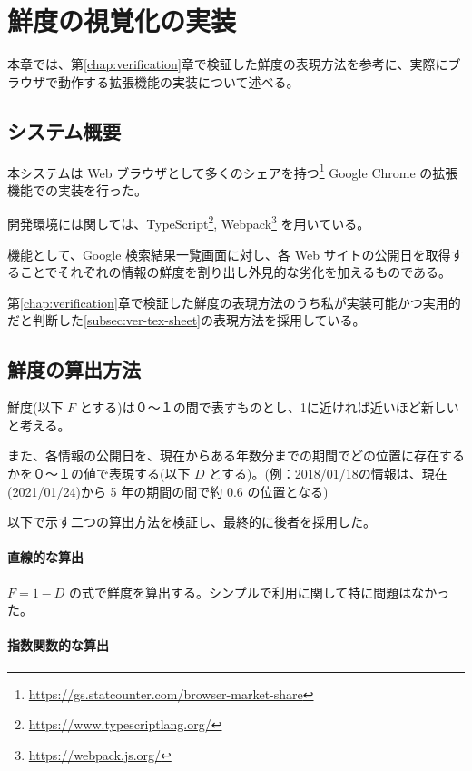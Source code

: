 \chapter{鮮度の視覚化の実装}
\label{chap:implementation}

本章では、第\ref{chap:verification}章で検証した鮮度の表現方法を参考に、実際にブラウザで動作する拡張機能の実装について述べる。

\section{システム概要}
\label{sec:imp_system}

本システムは Web ブラウザとして多くのシェアを持つ\footnote{\url{https://gs.statcounter.com/browser-market-share}} Google Chrome の拡張機能での実装を行った。

開発環境には関しては、TypeScript\footnote{\url{https://www.typescriptlang.org/}}, Webpack\footnote{\url{https://webpack.js.org/}} を用いている。

機能として、Google 検索結果一覧画面に対し、各 Web サイトの公開日を取得することでそれぞれの情報の鮮度を割り出し外見的な劣化を加えるものである。

第\ref{chap:verification}章で検証した鮮度の表現方法のうち私が実装可能かつ実用的だと判断した\ref{subsec:ver-tex-sheet}の表現方法を採用している。

\section{鮮度の算出方法}
\label{sec:imp_calculation}

鮮度(以下 $F$ とする)は０～１の間で表すものとし、1に近ければ近いほど新しいと考える。

また、各情報の公開日を、現在からある年数分までの期間でどの位置に存在するかを０～１の値で表現する(以下 $D$ とする)。(例：2018/01/18の情報は、現在(2021/01/24)から 5 年の期間の間で約 0.6 の位置となる)

以下で示す二つの算出方法を検証し、最終的に後者を採用した。

\subsubsection{直線的な算出}

$ F = 1 - D $ の式で鮮度を算出する。シンプルで利用に関して特に問題はなかった。

\subsubsection{指数関数的な算出}

